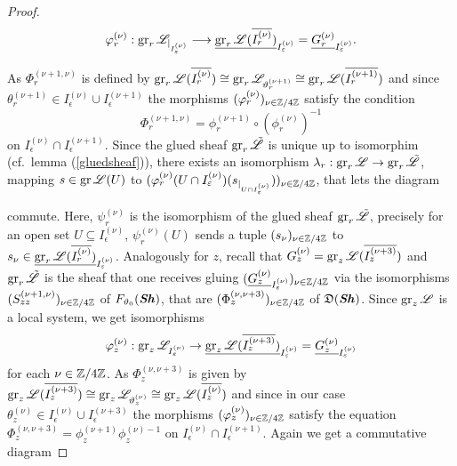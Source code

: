 \begin{proof}
\[
\varphi_r^{(\nu)}: \operatorname{gr}_r\mathscr{L}_{\vert_{I^{(\nu)}_\varepsilon}} \longrightarrow \underline{\operatorname{gr}_r\mathscr{L}(\overline{I_r^{(\nu)}})}_{I_\varepsilon^{(\nu)}} = \underline{G_r^{(\nu)}}_{I^{(\nu)}_\varepsilon}.
\]

As $\Phi_r^{(\nu+1,\nu)}$ is defined by $\operatorname{gr}_r\mathscr{L}(\overline{I_r^{(\nu)}}) \cong \operatorname{gr}_r\mathscr{L}_{\vartheta_r^{(\nu+1)}} \cong \operatorname{gr}_r\mathscr{L}(\overline{I_r^{(\nu+1)}})$ and since $\theta_r^{(\nu+1)} \in I_\epsilon^{(\nu)} \cup I_\epsilon^{(\nu+1)}$
the morphisms $(\varphi_r^{(\nu)})_{\nu \in \mathbb{Z}/4\mathbb{Z}}$ satisfy the condition 
\[
\Phi_{r}^{(\nu+1,\nu)} = \phi_r^{(\nu+1)}\circ (\phi_r^{(\nu)})^{-1}
\]
on $I^{(\nu)}_\epsilon \cap I^{(\nu+1)}_\epsilon$. Since the glued sheaf $\operatorname{gr}_r\tilde{\mathscr{L}}$ is unique up to isomorphim (cf.\ lemma (\ref{gluedsheaf})), there exists an isomorphism $\lambda_r : \operatorname{gr}_r\mathscr{L} \to \operatorname{gr}_r\tilde{\mathscr{L}}$, mapping $s \in \operatorname{gr}\mathscr{L}(U)$ to $(\varphi_r^{(\nu)}(U \cap I_\varepsilon^{(\nu)})(s_{\vert_{U \cap I_\varepsilon^{(\nu)}}}))_{\nu \in \mathbb{Z}/4\mathbb{Z}}$, that lets the diagram 
\begin{center}
\end{center}
commute. Here, $\psi_r^{(\nu)}$ is the isomorphism of the glued sheaf $\operatorname{gr}_r\tilde{\mathscr{L}}$, precisely for an open set $U \subseteq I_\epsilon^{(\nu)}$,  $\psi_r^{(\nu)}(U)$ sends a tuple $(s_\nu)_{\nu \in \mathbb{Z}/4\mathbb{Z}}$ to $s_\nu \in \underline{\operatorname{gr}_r\mathscr{L}(\overline{I_r^{(\nu)}})}_{I_\varepsilon^{(\nu)}}$.
Analogously for $z$, recall that $G_z^{(\nu)} = \operatorname{gr}_z\mathscr{L}(\overline{I_z^{(\nu+3)}})$ and $\operatorname{gr}_r\tilde{\mathscr{L}}$ is the sheaf that one receives gluing $(\underline{G_z^{(\nu)}}_{I^{(\nu)}_\varepsilon})_{\nu \in \mathbb{Z}/4\mathbb{Z}}$ via the isomorphisms $(S_{zz}^{(\nu+1,\nu)})_{\nu \in \mathbb{Z}/4\mathbb{Z}}$ of $F_{\vartheta_0}(\bm{\mathit{Sh}})$, that are $(\Phi_z^{(\nu,\nu+3)})_{\nu \in \mathbb{Z}/4\mathbb{Z}}$ of $\mathfrak{D}(\bm{\mathit{Sh}})$. Since $\operatorname{gr}_z\mathscr{L}$ is a local system, we get isomorphisms
\[\varphi_z^{(\nu)}: \operatorname{gr}_z\mathscr{L}_{I_\varepsilon^{(\nu)}} \to \underline{\operatorname{gr}_z\mathscr{L}(\overline{I_z^{(\nu+3)}})}_{I_\varepsilon^{(\nu)}} = \underline{G_z^{(\nu)}}_{I_\varepsilon^{(\nu)}}\]
for each $\nu \in \mathbb{Z}/4\mathbb{Z}$. As $\Phi_z^{(\nu,\nu+3)}$ is given by $\operatorname{gr}_z\mathscr{L}(\overline{I_z^{(\nu+3)}}) \cong \operatorname{gr}_z\mathscr{L}_{\vartheta_z^{(\nu)}} \cong \operatorname{gr}_z\mathscr{L}(\overline{I_z^{(\nu)}})$ and since in our case $\theta_z^{(\nu)} \in I_\epsilon^{(\nu)} \cup I_\epsilon^{(\nu+3)}$ the morphisms $(\varphi_z^{(\nu)})_{\nu \in \mathbb{Z}/4\mathbb{Z}}$ satisfy the equation $\Phi_z^{(\nu,\nu+3)} = \phi_z^{(\nu+1)}\phi_z^{(\nu)-1}$ on $I_\epsilon^{(\nu)} \cap I_\epsilon^{(\nu+1)}$. Again we get a commutative diagram 


\end{proof}
